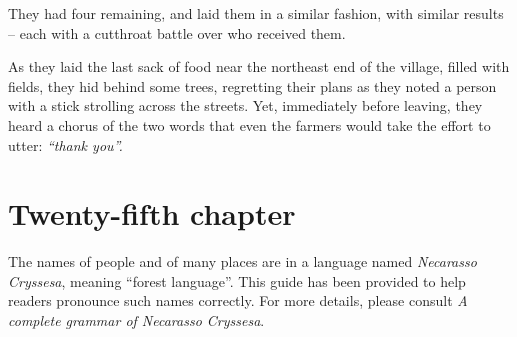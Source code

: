 They had four remaining, and laid them in a similar fashion, with similar results -- each with a cutthroat battle over who received them.

As they laid the last sack of food near the northeast end of the village, filled with fields, they hid behind some trees, regretting their plans as they noted a person with a stick strolling across the streets. Yet, immediately before leaving, they heard a chorus of the two words that even the farmers would take the effort to utter: \emph{``thank you''.}

\chapter{Twenty-fifth chapter}



\appendix
\showappendices


The names of people and of many places are in a language named \emph{Necarasso Cryssesa}, meaning ``forest language''. This guide has been provided to help readers pronounce such names correctly. For more details, please consult \emph{A complete grammar of Necarasso Cryssesa}.

